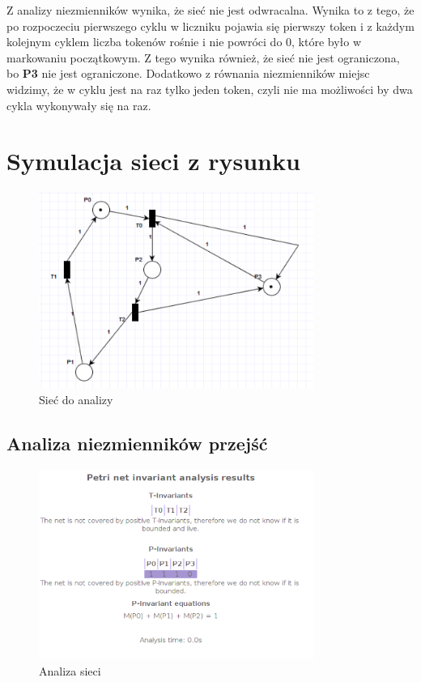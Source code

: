 \documentclass{article}
\begin{document}
Z analizy niezmienników wynika, że sieć nie jest odwracalna. Wynika to z tego, że po rozpoczeciu pierwszego cyklu
w liczniku pojawia się pierwszy token i z każdym kolejnym cyklem liczba tokenów rośnie i nie powróci do 0, które było w markowaniu początkowym.
Z tego wynika również, że sieć nie jest ograniczona, bo \textbf{P3} nie jest ograniczone. 
Dodatkowo z równania niezmienników miejsc widzimy, że w cyklu jest na raz tylko jeden token, czyli
nie ma możliwości by dwa cykla wykonywały się na raz.

\section{Symulacja sieci z rysunku}
\begin{figure}[H]
    \centering
    \includegraphics[width=0.8\textwidth, height=0.4\textheight]{zad2.png}
    \caption{Sieć do analizy}
\end{figure}

\subsection{Analiza niezmienników przejść}
\begin{figure}[H]
    \centering
    \includegraphics[width=0.8\textwidth, height=0.4\textheight]{zad2_analiza.png}
    \caption{Analiza sieci}
\end{figure}
\end{document}
